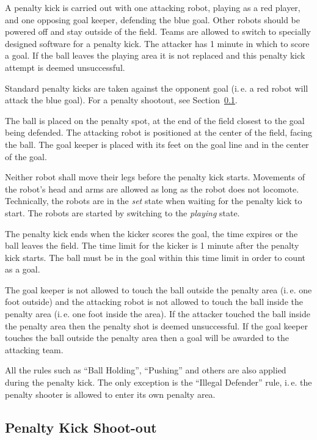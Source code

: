 \documentclass[12pt]{article}
\newcommand{\ie}{\mbox{i.\,e.}\xspace}
\begin{document}
A penalty kick is carried out with one attacking robot, playing as a red player, and one
opposing goal keeper, defending the blue goal. Other robots should be powered off and stay outside of the
field. Teams are allowed to switch to specially designed software
for a penalty kick. The attacker has 1 minute in which to score a
goal. If the ball leaves the playing area it is not replaced and
this penalty kick attempt is deemed unsuccessful.

Standard penalty kicks are taken against the opponent goal (\ie a
red robot will attack the blue goal). For a penalty shootout, see
Section~\ref{sec:penalty_shoot-out}.

The ball is placed on the penalty spot, at the end of the field closest to the goal being defended. The attacking robot is positioned at the center of the field, facing the ball. The goal keeper is placed with its feet on the
goal line and in the center of the goal.

Neither robot shall move their legs before the penalty kick starts. Movements of the
robot's head and arms are allowed as long as the robot does not
locomote. Technically, the robots are in the \emph{set} state when
waiting for the penalty kick to start. The robots are started by
switching to the \emph{playing} state.

The penalty
kick ends when the kicker scores the goal, the time expires or the
ball leaves the field. The time limit for the kicker is 1 minute
after the penalty kick starts. The ball must be in the goal within
this time limit in order to count as a goal.

The goal keeper is not allowed to touch the ball outside the penalty area (\ie one foot
outside) and the attacking robot is not allowed to touch the ball inside the penalty
area (\ie one foot inside the area). If the attacker touched the ball inside the
penalty area then the penalty shot is deemed unsuccessful. If the
goal keeper touches the ball outside the penalty area then a goal will be awarded to the
attacking team.

All the rules such as ``Ball Holding'', ``Pushing'' and
others are also applied during the penalty kick. The only exception
is the ``Illegal Defender'' rule, \ie the penalty shooter is allowed
to enter its own penalty area.

\subsection{Penalty Kick Shoot-out}
\label{sec:penalty_shoot-out}
\end{document}
